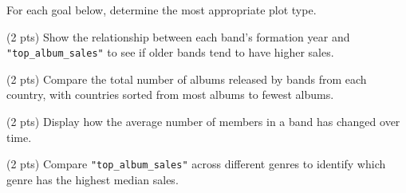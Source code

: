 \documentclass[twoside,12pt]{article}
\begin{document}
\begin{probset}
\begin{prob}[(10 pts)]
\begin{subprobset}
\begin{subprob}
\smallskip
{}

\small
{}


\smallskip
{}

\smallskip
{}

\smallskip
{}

\end{subprob}
\end{subprobset}
\end{prob}

\newpage

\begin{prob}[(10 pts)]

For each goal below, determine the most appropriate plot type.

\begin{subprobset}

\begin{subprob}(2 pts)
Show the relationship between each band's formation year and \texttt{"top\_album\_sales"} to see if older bands tend to have higher sales.

\smallskip
{}

\end{subprob}
\begin{subprob}(2 pts)
Compare the total number of albums released by bands from each country, with countries sorted from most albums to fewest albums.

\smallskip
{}

\end{subprob}
\begin{subprob}(2 pts)
Display how the average number of members in a band has changed over time.

\smallskip
{}
\end{subprob}
\begin{subprob}(2 pts)
Compare \texttt{"top\_album\_sales"} across different genres to identify which genre has the highest median sales.


\end{subprob}
\end{subprobset}
\end{prob}
\end{probset}
\end{document}
